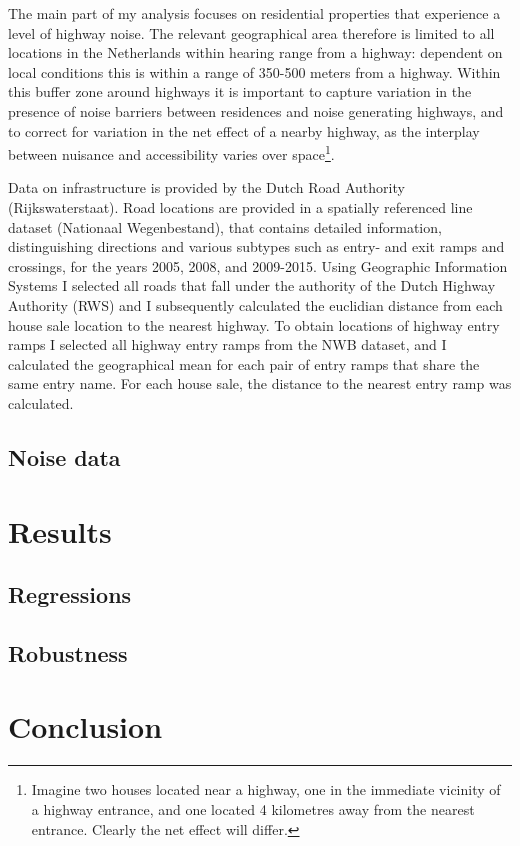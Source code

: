 \documentclass[]{scrartcl}
\begin{document}
The main part of my analysis focuses on residential properties that experience a level of highway noise. The relevant geographical area therefore is limited to all locations in the Netherlands within hearing range from a highway: dependent on local conditions this is within a range of 350-500 meters from a highway\citep{Nelson1982}. Within this buffer zone around highways it is important to capture variation in the presence of noise barriers between residences and noise generating highways, and to correct for variation in the net effect of a nearby highway, as the interplay between nuisance and accessibility varies over space\footnote{Imagine two houses located near a highway, one in the immediate vicinity of a highway entrance, and one located 4 kilometres away from the nearest entrance. Clearly the net effect will differ.}. 

Data on infrastructure is provided by the Dutch Road Authority (Rijkswaterstaat). Road locations are provided in a spatially referenced line dataset (Nationaal Wegenbestand), that contains detailed information, distinguishing directions and various subtypes such as entry- and exit ramps and crossings, for the years 2005, 2008, and 2009-2015. Using Geographic Information Systems I selected all roads that fall under the authority of the Dutch Highway Authority (RWS) and I subsequently calculated the euclidian distance from each house sale location to the nearest highway. To obtain locations of highway entry ramps I selected all highway entry ramps from the NWB dataset, and I calculated the geographical mean for each pair of entry ramps that share the same entry name. For each house sale, the distance to the nearest entry ramp was calculated.

\subsection{Noise data}

\section{Results}

\subsection{Regressions}

\subsection{Robustness}

\section{Conclusion}




\end{document}
